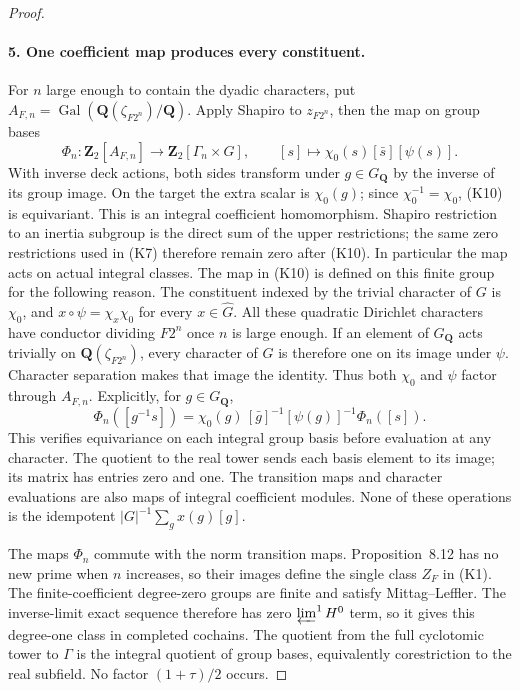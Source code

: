 \documentclass[11pt]{article}
\theoremstyle{definition}
\theoremstyle{remark}
\begin{document}
\begin{proof}
\paragraph{5. One coefficient map produces every constituent.}
For $n$ large enough to contain the dyadic characters, put
$A_{F,n}=\operatorname{Gal}(\mathbf Q(\zeta_{F2^n})/\mathbf Q)$.
Apply Shapiro to $z_{F2^n}$, then the map on group bases
\[
 \Phi_n:\mathbf Z_2[A_{F,n}]\longrightarrow
                  \mathbf Z_2[\Gamma_n\times G],\qquad
 [s]\longmapsto\chi_0(s)[\bar s][\psi(s)].                 \tag{K10}
\]
With inverse deck actions, both sides transform under $g\in G_{\mathbf Q}$
by the inverse of its group image. On the target the extra scalar
is $\chi_0(g)$; since $\chi_0^{-1}=\chi_0$, (K10) is equivariant.
This is an integral coefficient homomorphism. Shapiro restriction
to an inertia subgroup is the direct sum of the upper restrictions;
the same zero restrictions used in (K7) therefore remain zero after
(K10). In particular the map acts on actual integral classes.
The map in (K10) is defined on this finite group for the following
reason. The constituent indexed by the trivial character of $G$ is
$\chi_0$, and
$x\circ\psi=\chi_x\chi_0$ for every $x\in\widehat G$.
All these quadratic Dirichlet characters have conductor dividing
$F2^n$ once $n$ is large enough. If an element of $G_{\mathbf Q}$
acts trivially on $\mathbf Q(\zeta_{F2^n})$, every character of $G$
is therefore one on its image under $\psi$. Character separation
makes that image the identity. Thus both $\chi_0$ and $\psi$
factor through $A_{F,n}$. Explicitly, for $g\in G_{\mathbf Q}$,
\[
 \Phi_n([g^{-1}s])
 =\chi_0(g)\,[\bar g]^{-1}[\psi(g)]^{-1}\Phi_n([s]).
\]
This verifies equivariance on each integral group basis before
evaluation at any character. The quotient to the real tower sends
each basis element to its image; its matrix has entries zero and
one. The transition maps and character evaluations are also maps
of integral coefficient modules. None of these operations is the
idempotent $|G|^{-1}\sum_g x(g)[g]$.


The maps $\Phi_n$ commute with the norm transition maps.
Proposition~8.12 has no new prime when $n$ increases, so their
images define the single class $Z_F$ in (K1).
The finite-coefficient degree-zero groups are finite and satisfy
Mittag--Leffler. The inverse-limit exact sequence
\cite[Corollary 4.1.3, p.~96]{nekovar} therefore has zero
$\varprojlim^1 H^0$ term, so it gives this degree-one class
in completed cochains.
The quotient from the full cyclotomic tower to $\Gamma$ is the
integral quotient of group bases, equivalently corestriction to
the real subfield. No factor $(1+\tau)/2$ occurs.


\end{proof}
\end{document}
